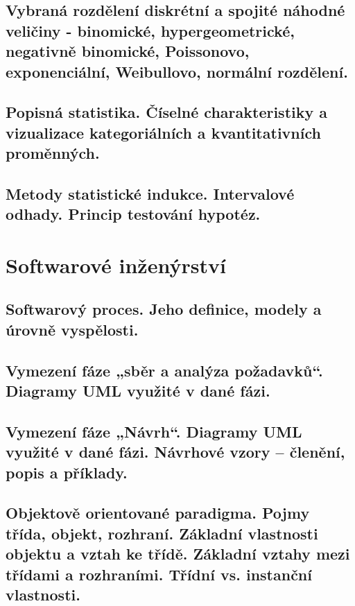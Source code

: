 \documentclass[openany]{book}
\begin{document}
\chapter{Vybraná rozdělení diskrétní a spojité náhodné veličiny - binomické, hypergeometrické, negativně binomické, Poissonovo, exponenciální, Weibullovo, normální rozdělení.}


\chapter{Popisná statistika. Číselné charakteristiky a vizualizace kategoriálních a kvantitativních proměnných.}


\chapter{Metody statistické indukce. Intervalové odhady. Princip testování hypotéz.}


\part{Softwarové inženýrství}

\chapter{Softwarový proces. Jeho definice, modely a úrovně vyspělosti.}


\chapter{Vymezení fáze „sběr a analýza požadavků“. Diagramy UML využité v dané fázi.}


\chapter{Vymezení fáze „Návrh“. Diagramy UML využité v dané fázi. Návrhové vzory – členění, popis a příklady. }


\chapter{Objektově orientované paradigma. Pojmy třída, objekt, rozhraní. Základní vlastnosti objektu a vztah ke třídě. Základní vztahy mezi třídami a rozhraními. Třídní vs. instanční vlastnosti.}

\end{document}
